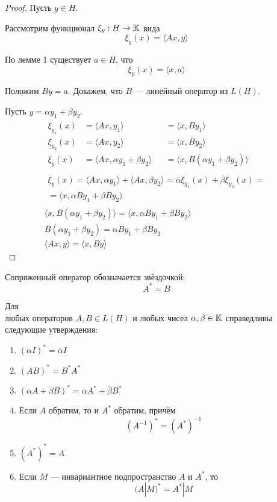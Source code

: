 \begin{proof}
    Пусть $y \in H$. 
    
    Рассмотрим функционал $\xi_y : H \to \mathbb{K}$ вида
    \[ \xi_y(x) = \langle Ax, y\rangle \]

    По лемме 1 существует $a \in H$, что 
    \[ \xi_y(x) = \langle x, a\rangle \]

    Положим $By = a$. Докажем, что $B$ — линейный оператор из $L(H)$.

    Пусть $y = \alpha y_1 + \beta y_2$.
    \begin{gather*}
        \begin{alignedat}{2}
            \xi_{y_1}(x) &= \langle Ax, y_1\rangle &&= \langle x, By_1\rangle \\
            \xi_{y_2}(x) &= \langle Ax, y_2\rangle &&= \langle x, By_2\rangle \\
            \xi_{y}(x) &= \langle Ax, \alpha y_1 + \beta y_2 \rangle &&= \langle x,
            B(\alpha y_1 + \beta y_2) \rangle
        \end{alignedat} \\
        \begin{multlined}
            \xi_{y}(x) = \langle Ax, \alpha y_1 \rangle + \langle Ax, \beta y_2
            \rangle = \overline{\alpha}\xi_{y_1}(x) + \overline{\beta}\xi_{y_2}(x) =\\= \langle x, \alpha
            By_1 + \beta By_2\rangle
        \end{multlined} \\
        \langle x, B(\alpha y_1 + \beta y_2) \rangle = \langle x, \alpha By_1 +
        \beta By_2\rangle \\
        B(\alpha y_1 + \beta y_2) = \alpha By_1 + \beta By_2 \\
        \langle Ax, y\rangle = \langle x, By\rangle
    \end{gather*}
\end{proof}

Сопряженный оператор обозначается звёздочкой:
\[ A^* = B \]

\begin{lemma}\label{lemma:adjointproperties}
    Для \\ любых операторов $A, B \in L(H)$ и любых чисел $\alpha, \beta \in
    \mathbb{K}$ справедливы следующие утверждения:
    \begin{enumerate}
        \item $ (\alpha I)^* = \overline{\alpha}I $
        \item $ (AB)^* = B^* A^* $
        \item $ (\alpha A + \beta B)^* = \overline{\alpha} A^* +
            \overline{\beta} B^* $
        \item Если $A$ обратим, то и $A^*$ обратим, причём
            \[ (A^{-1})^* = (A^*)^{-1} \]
        \item $ (A^*)^* = A $
        \item Если $M$ — инвариантное подпространство $A$ и $A^*$, то 
            \[ (A|M)^* = A^* | M \]
    \end{enumerate}
\end{lemma}

